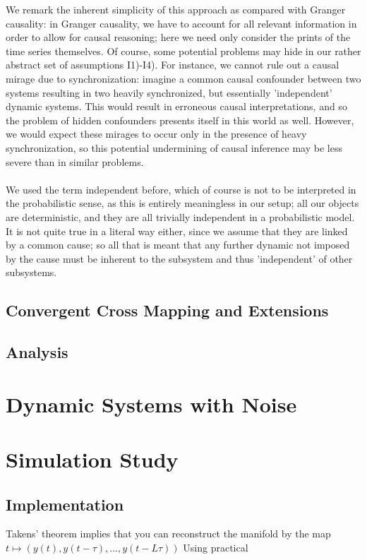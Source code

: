 \documentclass[11pt, a4paper]{memoir}
\theoremstyle{plain}
\theoremstyle{definition}
\begin{document}
We remark the inherent simplicity of this approach as compared with Granger causality: in Granger causality, we have to account for all relevant information in order to allow for causal reasoning; here we need only consider the prints of the time series themselves. Of course, some potential problems may hide in our rather abstract set of assumptions I1)-I4). For instance, we cannot rule out a causal mirage due to synchronization: imagine a common causal confounder between two systems resulting in two heavily synchronized, but essentially 'independent' dynamic systems. This would result in erroneous causal interpretations, and so the problem of hidden confounders presents itself in this world as well. However, we would expect these mirages to occur only in the presence of heavy synchronization, so this potential undermining of causal inference may be less severe than in similar problems.\\\\ 
We used the term independent before, which of course is not to be interpreted in the probabilistic sense, as this is entirely meaningless in our setup; all our objects are deterministic, and they are all trivially independent in a probabilistic model. It is not quite true in a literal way either, since we assume that they are linked by a common cause; so all  that is meant that any further dynamic not imposed by the cause must be inherent to the subsystem and thus 'independent' of other subsystems.

\section{Convergent Cross Mapping and Extensions}

\section{Analysis}


\chapter{Dynamic Systems with Noise}
 



\chapter{Simulation Study}
\section{Implementation}
Takens' theorem implies that you can reconstruct the manifold by the map
$t\mapsto (y(t),y(t-\tau),...,y(t-L\tau))$
Using practical  
\end{document}
